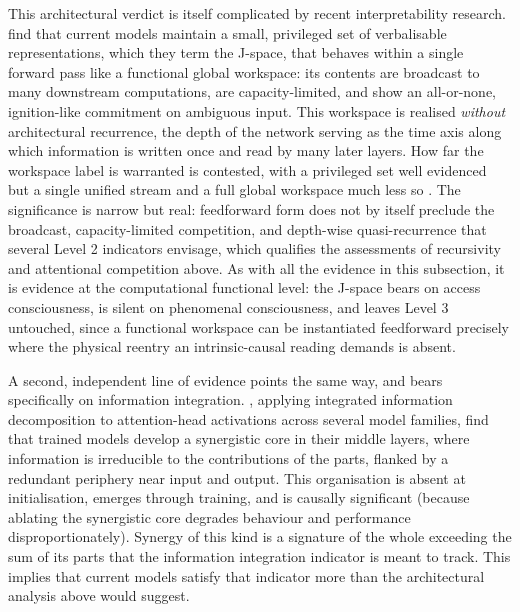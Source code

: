 \documentclass[11pt, a4paper, onecolumn, gdm]{google}
\newcounter{none}
\begin{document}
This architectural verdict is itself complicated by recent interpretability research.
\citet{gurnee2026} find that current models maintain a small, privileged set of verbalisable representations, which they term the J-space, that behaves within a single forward pass like a functional global workspace: its contents are broadcast to many downstream computations, are capacity-limited, and show an all-or-none, ignition-like commitment on ambiguous input.
This workspace is realised \emph{without} architectural recurrence, the depth of the network serving as the time axis along which information is written once and read by many later layers.
How far the workspace label is warranted is contested, with a privileged set well evidenced but a single unified stream and a full global workspace much less so \citetext{\citealp{butlin2026}; \citealp{nanda2026}, who reads the secure claim more conservatively as a working memory and independently replicates it on an open-weight model}.
The significance is narrow but real: feedforward form does not by itself preclude the broadcast, capacity-limited competition, and depth-wise quasi-recurrence that several Level 2 indicators envisage, which qualifies the assessments of recursivity and attentional competition above.
As with all the evidence in this subsection, it is evidence at the computational functional level: the J-space bears on access consciousness, is silent on phenomenal consciousness, and leaves Level 3 untouched, since a functional workspace can be instantiated feedforward precisely where the physical reentry an intrinsic-causal reading demands is absent.

A second, independent line of evidence points the same way, and bears specifically on information integration.
\citet{urbinarodriguez2026}, applying integrated information decomposition to attention-head activations across several model families, find that trained models develop a synergistic core in their middle layers, where information is irreducible to the contributions of the parts, flanked by a redundant periphery near input and output.
This organisation is absent at initialisation, emerges through training, and is causally significant (because ablating the synergistic core degrades behaviour and performance disproportionately).
Synergy of this kind is a signature of the whole exceeding the sum of its parts that the information integration indicator is meant to track.
This implies that current models satisfy that indicator more than the architectural analysis above would suggest.
\end{document}
